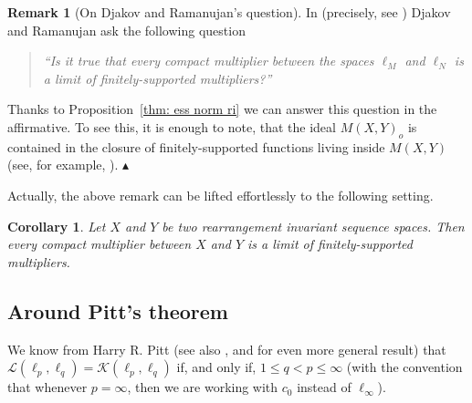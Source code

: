 \documentclass[11pt]{amsart}
\theoremstyle{definition}
\theoremstyle{definition}
\theoremstyle{definition}
\newtheorem{corollary}[theorem]{Corollary}
\theoremstyle{definition}
\theoremstyle{definition}
\theoremstyle{definition}
\newtheorem{remark}[theorem]{Remark}
\theoremstyle{definition}
\theoremstyle{definition}
\numberwithin{equation}{section}
\numberwithin{equation}{section}
\numberwithin{equation}{section}
\theoremstyle{definition}
\theoremstyle{definition}
\theoremstyle{definition}
\theoremstyle{definition}
\theoremstyle{definition}
\theoremstyle{definition}
\newcommand\xqed[1]{%
	\leavevmode\unskip\penalty9999 \hbox{}\nobreak\hfill
	\quad\hbox{#1}}
\newcommand\demo{\xqed{{\Large $\blacktriangle$}}}
\begin{document}
\begin{remark}[On Djakov and Ramanujan's question] \label{REMARK: Djakov-Ramanujan}
	In \cite{DR00} (precisely, see \cite[p.~318]{DR00}) Djakov and Ramanujan ask the following question
	\begin{quote}
		{\it \enquote{Is it true that every compact multiplier between the spaces $\ell_M$ and $\ell_N$ is a limit of finitely-supported multipliers?}}
	\end{quote}
	Thanks to Proposition~\ref{thm: ess norm ri} we can answer this question in the affirmative.
	To see this, it is enough to note, that the ideal $M(X,Y)_o$ is contained in the closure of finitely-supported
	functions living inside $M(X,Y)$ (see, for example, \cite[Theorem~3.11, p.~18]{BS88}).
	\demo
\end{remark}

Actually, the above remark can be lifted effortlessly to the following setting. 

\begin{corollary}
	{\it Let $X$ and $Y$ be two rearrangement invariant sequence spaces.
	Then every compact multiplier between $X$ and $Y$ is a limit of finitely-supported multipliers.}
\end{corollary}

\subsection{Around Pitt's theorem}

We know from Harry R. Pitt \cite{Pit32} (see also \cite[Proposition~2.c.3, p.~76]{LT77}, \cite[Theorem~2.1.4, p.~32]{AK06} and
\cite[Theorem~A2]{Ros69} for even more general result) that ${\mathscr L}(\ell_p,\ell_q) = {\mathscr K}(\ell_p,\ell_q)$
if, and only if, $1 \leqslant q < p \leqslant \infty$
(with the convention that whenever $p = \infty$, then we are working with $c_0$ instead of $\ell_{\infty}$).
\end{document}
